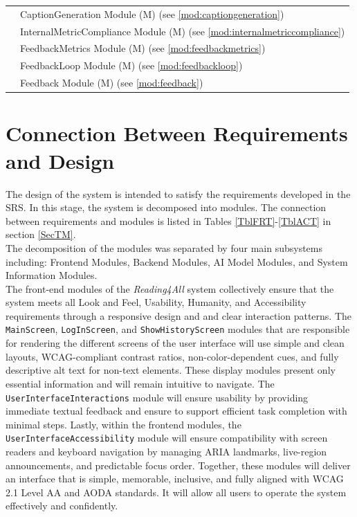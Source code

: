 \documentclass[12pt, titlepage]{article}
\newcounter{mnum}
\newcommand{\mthemnum}{M\themnum}
\begin{document}
\begin{table}[h!]
\begin{tabularx}{\textwidth}{>{\RaggedRight\arraybackslash}p{}Y}
    & {CaptionGeneration Module (\mthemnum \label{mod:captiongeneration_table}) (see \ref{mod:captiongeneration})}\\
    & {InternalMetricCompliance Module (\mthemnum \label{mod:internalmetriccompliance_table}) (see \ref{mod:internalmetriccompliance})}\\
    & {FeedbackMetrics Module (\mthemnum \label{mod:feedbackmetrics_table}) (see \ref{mod:feedbackmetrics})}\\
    & {FeedbackLoop Module (\mthemnum \label{mod:feedbackloop_table}) (see \ref{mod:feedbackloop})}\\
    & {Feedback Module (\mthemnum \label{mod:feedback_table}) (see \ref{mod:feedback})}\\
    \bottomrule
  \end{tabularx}
\end{table}

\section{Connection Between Requirements and Design} \label{SecConnection}

The design of the system is intended to satisfy the requirements developed in
the SRS. In this stage, the system is decomposed into modules. The connection
between requirements and modules is listed in Tables
\ref{TblFRT}-\ref{TblACT} in
section \ref{SecTM}.\\

The decomposition of the modules was separated by four main subsystems
including: Frontend Modules,
Backend Modules, AI Model Modules, and System Information Modules. \\

The front-end modules of the \textit{Reading4All} system collectively ensure that the system meets all Look and Feel, Usability, 
Humanity, and Accessibility requirements through a responsive design and 
and clear interaction patterns. The \texttt{MainScreen}, \texttt{LogInScreen}, and \texttt{ShowHistoryScreen} modules that are responsible for rendering 
the different screens of the user interface will use simple and clean layouts, 
WCAG-compliant contrast ratios, non-color-dependent cues, and fully descriptive alt text for non-text elements. These display modules present 
only essential information and will remain intuitive to navigate. The \texttt{UserInterfaceInteractions} module will
ensure usability by providing immediate textual feedback and ensure to support efficient task 
completion with minimal steps. Lastly, within the frontend modules, the \texttt{UserInterfaceAccessibility} module will ensure compatibility with screen readers and keyboard navigation by 
managing ARIA landmarks, live-region announcements, and predictable focus order. Together, these modules will deliver an interface that is simple, memorable, 
inclusive, and fully aligned with WCAG 2.1 Level AA and AODA standards. It will allow all users to operate the system effectively and confidently.\\
\end{document}
